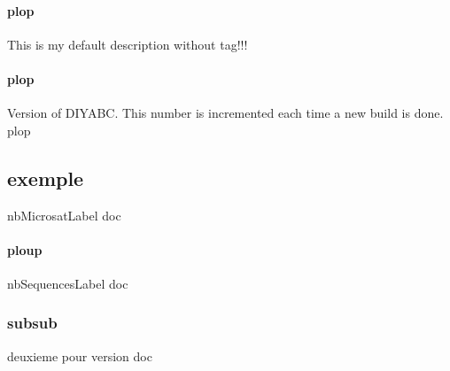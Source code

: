 \documentclass[12pt,a4paper]{article}
\begin{document}
        \paragraph{plop}
        \label{doc_versionLabel}
        This is my default description without tag!!!

        \paragraph{plop}
        \label{doc_versionLabel+++plop+++plap}
        Version of DIYABC. This number is incremented each time a new build is done.
        plop

        \subsection{exemple}
        \label{doc_nbMicrosatLabel}
        nbMicrosatLabel doc
            \paragraph{ploup}
            \label{doc_nbSequencesLabel}
            nbSequencesLabel doc

            \subsubsection{subsub}
            \label{doc_versionLabel+++plip}
            deuxieme pour version doc
\end{document}
